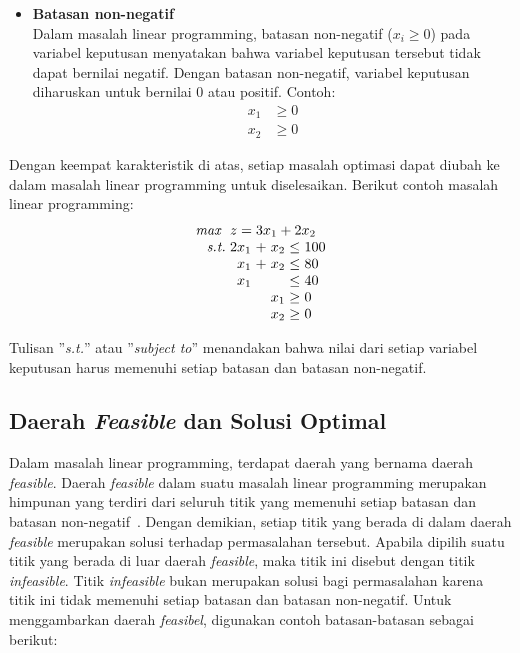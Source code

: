 \begin{itemize}
	\item \textbf{Batasan non-negatif}\\
		Dalam masalah linear programming, batasan non-negatif (\(x_i\geq 0\)) pada variabel keputusan menyatakan bahwa variabel keputusan tersebut tidak dapat bernilai negatif. Dengan batasan non-negatif, variabel keputusan diharuskan untuk bernilai 0 atau positif. Contoh:
		\begin{equation*}
			\begin{split}
    			x_1 &\geq 0 \\
    			x_2 &\geq 0
			\end{split}
		\end{equation*}
		
\end{itemize}

Dengan keempat karakteristik di atas, setiap masalah optimasi dapat diubah ke dalam masalah linear programming untuk diselesaikan. Berikut contoh masalah linear programming:
\begin{equation*}
	\setlength\arraycolsep{1.5pt}
	\begin{array}{r r c r c l}
		\textit{max } &\multicolumn{5}{l}{z = 3x_1 + 2x_2}\\
		\textit{s.t.} &2x_1 &+ &x_2 &\leq &100\\
		&x_1 &+ &x_2 &\leq &80\\
		&x_1 &&&\leq &40\\
		&&&x_1 &\geq &0\\
		&&&x_2 &\geq &0\\
	\end{array}
\end{equation*}

	Tulisan ''\textit{s.t.}'' atau ''\textit{subject to}'' menandakan bahwa nilai dari setiap variabel keputusan harus memenuhi setiap batasan dan batasan non-negatif.

\subsection{Daerah \textit{Feasible} dan Solusi Optimal}
Dalam masalah linear programming, terdapat daerah yang bernama daerah \textit{feasible}. Daerah \textit{feasible} dalam suatu masalah linear programming merupakan himpunan yang terdiri dari seluruh titik yang memenuhi setiap batasan dan batasan non-negatif~\cite{winston2004operations}. Dengan demikian, setiap titik yang berada di dalam daerah \textit{feasible} merupakan solusi terhadap permasalahan tersebut. Apabila dipilih suatu titik yang berada di luar daerah \textit{feasible}, maka titik ini disebut dengan titik \textit{infeasible}. Titik \textit{infeasible} bukan merupakan solusi bagi permasalahan karena titik ini tidak memenuhi setiap batasan dan batasan non-negatif. Untuk menggambarkan daerah \textit{feasibel}, digunakan contoh batasan-batasan sebagai berikut:

